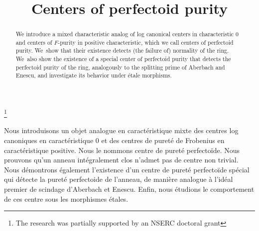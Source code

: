 \documentclass[JEP,XML,SOM,Unicode,published]{cedram}
\theoremstyle{plain}
\theoremstyle{definition}
\numberwithin{equation}{theorem}
\begin{document}
\frontmatter
\title{Centers of perfectoid purity}

\author[\initial{A.} \lastname{Fayolle}]{ }
\address{Department of Mathematics, University of Utah,\\
Salt Lake City, UT 84112, USA}

\thanks{The research was partially supported by an NSERC doctoral grant}

\begin{abstract}
We introduce a mixed characteristic analog of log canonical centers in characteristic $0$ and centers of $F$-purity in positive characteristic, which we call centers of perfectoid purity. We~show that their existence detects (the failure of) normality of the ring. We~also show the existence of a special center of perfectoid purity that detects the perfectoid purity of the ring, analogously to the splitting prime of Aberbach and Enescu, and investigate its behavior under étale morphisms.
\end{abstract}





\begin{altabstract}
Nous introduisons un objet analogue en caractéristique mixte des centres log canoniques en caractéristique $0$ et des centres de pureté de Frobenius en caractéristique positive. Nous le nommons centre de pureté perfectoïde. Nous prouvons qu’un anneau intégralement clos n’admet pas de centre non trivial. Nous démontrons également l'existence d'un centre de pureté perfectoïde spécial qui détecte la pureté perfectoide de l'anneau, de manière analogue à l'idéal premier de scindage d'Aberbach et Enescu. Enfin, nous étudions le comportement de ces centre sous les morphismes étales.
\end{altabstract}

\maketitle
\vspace*{-\baselineskip}
\tableofcontents
\end{document}
